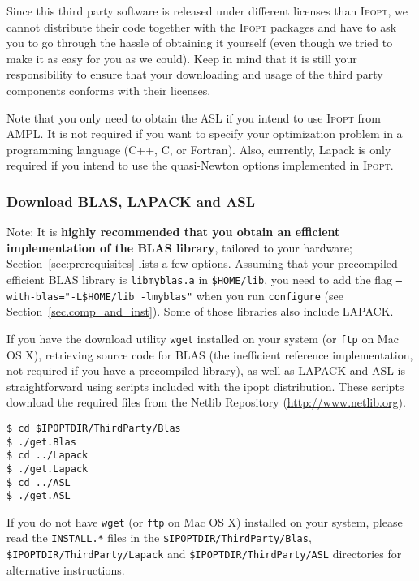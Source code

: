 \documentclass[10pt]{article}
\newcommand{\Ipopt}{\textsc{Ipopt}\xspace}
\begin{document}
Since this third party software is released under different licenses than
\Ipopt, we cannot distribute their code together with the \Ipopt
packages and have to ask you to go through the hassle of obtaining it
yourself (even though we tried to make it as easy for you as we
could).  Keep in mind that it is still your responsibility to ensure
that your downloading and usage of the third party components conforms
with their licenses.

Note that you only need to obtain the ASL if you intend to use \Ipopt
from AMPL.  It is not required if you want to specify your
optimization problem in a programming language (C++, C, or Fortran).
Also, currently, Lapack is only required if you intend to use the
quasi-Newton options implemented in \Ipopt.

\subsubsection{Download BLAS, LAPACK and ASL}
Note: It is \textbf{highly recommended that you obtain an efficient
  implementation of the BLAS library}, tailored to your hardware;
Section~\ref{sec:prerequisites} lists a few options.  Assuming that
your precompiled efficient BLAS library is \texttt{libmyblas.a} in
\texttt{\$HOME/lib}, you need to add the flag
\texttt{--with-blas="-L\$HOME/lib -lmyblas"} when you run
\texttt{configure} (see Section~\ref{sec.comp_and_inst}).  Some of
those libraries also include LAPACK.

If you have the download utility \texttt{wget} installed on your
system (or \texttt{ftp} on Mac OS X), retrieving source code for
BLAS (the inefficient reference
implementation, not required if you have a precompiled library), as
well as LAPACK and ASL is straightforward using scripts included with
the ipopt distribution.  These scripts download the required files
from the Netlib Repository
(\url{http://www.netlib.org}).
\medskip

\noindent
{\tt \$ cd \$IPOPTDIR/ThirdParty/Blas}\\
{\tt \$ ./get.Blas}\\
{\tt \$ cd ../Lapack}\\
{\tt \$ ./get.Lapack}\\
{\tt \$ cd ../ASL}\\
{\tt \$ ./get.ASL}
\medskip

\noindent
If you do not have \texttt{wget} (or \texttt{ftp} on Mac OS X) installed
on your system, please read the \texttt{INSTALL.*} files in the
\texttt{\$IPOPTDIR/ThirdParty/Blas},
\texttt{\$IPOPTDIR/ThirdParty/Lapack} and
\texttt{\$IPOPTDIR/ThirdParty/ASL} directories for alternative
instructions.
\end{document}
